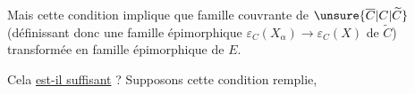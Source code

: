 Mais cette condition implique que  famille couvrante  de $\unsure{\overline C|C|\widetilde C}$ (définissant donc une famille épimorphique $\varepsilon_C(X_\alpha)\longrightarrow\varepsilon_C(X)$ de $\widetilde C$)  transformée en famille épimorphique de $E$.

Cela \uline{est-il suffisant} ? Supposons cette condition remplie,


